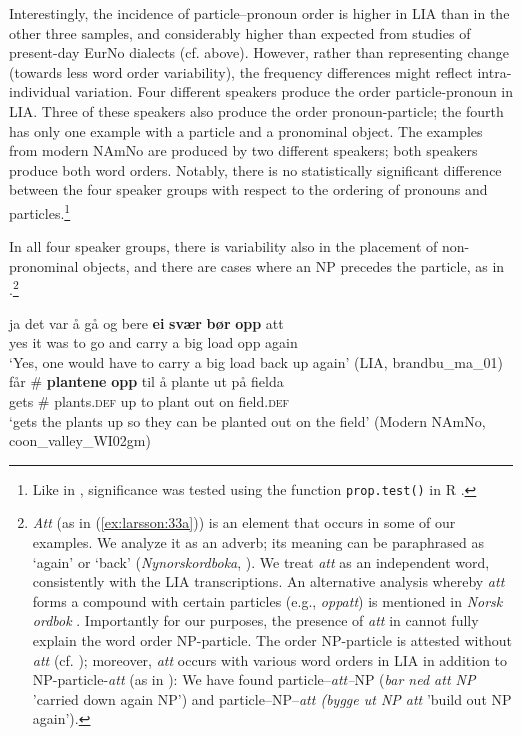 \documentclass[output=paper]{langscibook}
\begin{document}
Interestingly, the incidence of particle–pronoun order is higher in LIA than in the other three samples, and considerably higher than expected from studies of present-day EurNo dialects (cf. above). However, rather than representing change (towards less word order variability), the frequency differences might reflect intra\hyp individual variation. Four different speakers produce the order particle\hyp pronoun in LIA. Three of these speakers also produce the order pronoun-particle; the fourth has only one example with a particle and a pronominal object. The examples from modern NAmNo are produced by two different speakers; both speakers produce both word orders. Notably, there is no statistically significant difference between the four speaker groups with respect to the ordering of pronouns and particles.\footnote{Like in \citet{LarssonForthcoming}, significance was tested using the function \texttt{prop.test()} in R  \citep{rcoreteam}.}

In all four speaker groups, there is variability also in the placement of non-pronominal objects, and there are cases where an NP precedes the particle, as in .\footnote{\textit{Att} (as in (\ref{ex:larsson:33a})) is an element that occurs in some of our examples. We analyze it as an adverb; its meaning can be paraphrased as `again’ or `back’ (\textit{Nynorskordboka}, \citealt{Nynorskordboka}). We treat \textit{att} as an independent word, consistently with the LIA transcriptions. An alternative analysis whereby \textit{att} forms a compound with certain particles (e.g., \textit{oppatt}) is mentioned in \textit{Norsk ordbok} \parencite{Groenvik2009}. Importantly for our purposes, the presence of \textit{att} in  cannot fully explain the word order NP-particle. The order NP-particle is attested without \textit{att} (cf. ); moreover, \textit{att} occurs with various word orders in LIA in addition to NP-particle-\textit{att} (as in ): We have found particle–\textit{att–}NP (\textit{bar ned att NP} ’carried down again NP’) and particle–NP–\textit{att (bygge ut NP att} ’build out NP again’).}

\ea%
    \label{ex:larsson:33}
    \ea  
    \gll ja det var å gå og bere \textbf{ei} \textbf{svær} \textbf{bør} \textbf{opp} {att}\\
         yes it was to go and carry a big load opp again\\
    \glt ‘Yes, one would have to carry a big load back up again’ (LIA, brandbu\_ma\_01)\label{ex:larsson:33a}\\
    \ex  
    \gll får \# \textbf{plantene} \textbf{opp} {til å} plante ut på fielda \\
         gets \# plants.\textsc{def} up to plant out on field.\textsc{def}\\
	\glt ‘gets the plants up so they can be planted out on the field’ (Modern NAmNo, coon\_valley\_WI02gm)\label{ex:larsson:33b}\\
    \z %
\z
\end{document}
